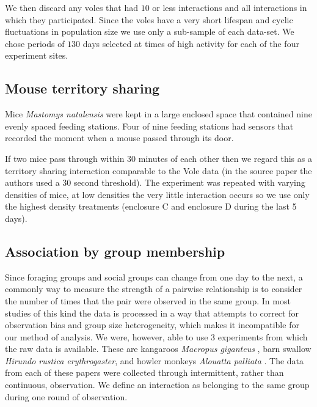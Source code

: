 \documentclass[10pt]{article}
\begin{document}
\begin{multicols}{2}
We then discard any voles that had $10$ or less interactions and all interactions in which they participated. Since the voles have a very short lifespan and cyclic fluctuations in population size we use only a sub-sample of each data-set. We chose periods of $130$ days selected at times of high activity for each of the four experiment sites.

\subsection{Mouse territory sharing}
Mice \emph{Mastomys natalensis} \cite{borremans2016nonlinear} were kept in a large enclosed space that contained nine evenly spaced feeding stations. Four of nine feeding stations had sensors that recorded the moment when a mouse passed through its door. 

If two mice pass through within $30$ minutes of each other then we regard this as a territory sharing interaction comparable to the Vole data (in the source paper the authors used a 30 second threshold). The experiment was repeated with varying densities of mice, at low densities the very little interaction occurs so we use only the highest density treatments (enclosure C and enclosure D during the last 5 days).

\subsection{Association by group membership}
Since foraging groups and social groups can change from one day to the next, a commonly way to measure the strength of a pairwise relationship is to consider the number of times that the pair were observed in the same group. In most studies of this kind the data is processed in a way that attempts to correct for observation bias and group size heterogeneity, which makes it incompatible for our method of analysis. We were, however, able to use $3$ experiments from which the raw data is available. These are kangaroos \emph{Macropus giganteus} \cite{Grant1973449}, barn swallow \emph{Hirundo rustica erythrogaster}\cite{levin2016stress}, and howler monkeys \emph{Alouatta palliata} \cite{sailer1984proximity}. The data from each of these papers were collected through intermittent, rather than continuous, observation. We define an interaction as belonging to the same group during one round of observation.


\end{multicols}
\end{document}
